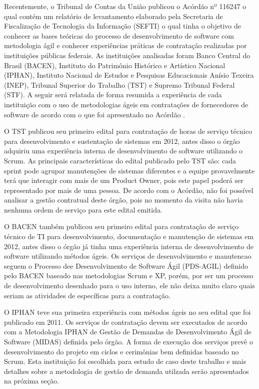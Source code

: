 Recentemente, o Tribunal de Contas da União publicou o Acórdão nº 116247 o qual contém um relatório de levantamento elaborado pela Secretaria de Fiscalização de Tecnologia da Informação (SEFTI) o qual tinha o objetivo de conhecer as bases teóricas do processo de desenvolvimento de software com metodologia ágil e conhecer experiências práticas de contratação realizadas por instituições públicas federais. As instituições analisadas foram Banco Central do Brasil (BACEN), Instituto do Patrimônio Histórico e Artístico Nacional (IPHAN), Instituto Nacional de Estudos e Pesquisas Educacionais Anísio Texeira (INEP), Tribunal Superior do Trabalho (TST) e Supremo Tribunal Federal (STF). A seguir será relatada de forma resumida a experiência de cada instituição com o uso de metodologias ágeis em contratações de fornecedores de software de acordo com o que foi apresentado no Acórdão  \cite{TCU:2013}.

O TST publicou seu primeiro edital para contratação de horas de serviço técnico para desenvolvimento e sustentação de sistemas em 2012, antes disso o órgão adquiriu uma experiência interna de desenvolvimento de software utilizando o Scrum. As principais características do edital publicado pelo TST são: cada sprint pode agrupar manutenções de sistemas diferentes e a equipe provavelmente terá que interagir com mais de um Product Owner, pois este papel poderá ser representado por mais de uma pessoa. De acordo com o Acórdão, não foi possível analisar a gestão contratual deste órgão, pois no momento da visita não havia nenhuma ordem de serviço para este edital emitida.

O BACEN também publicou seu primeiro edital para contratação de serviço técnico de TI para desenvolvimento, documentação e manutenção de sistemas em 2012, antes disso o órgão já tinha uma experiência interna de desenvolvimento de software utilizando métodos ágeis. Os serviços de desenvolvimento e manutencao seguem o Processo dee Desenvolvimento de Software Ágil (PDS-AGIL) definido pelo BACEN baseado nas metodologias Scrum e XP, porém, por ser um processo de desenvolvimento desenhado para o uso interno, ele não deixa muito claro quais seriam as atividades de específicas para a contratação. 

O IPHAN teve sua primeira experiência com métodos ágeis no seu edital que foi publicado em 2011. Os serviços de contratação devem ser executados de acordo com a Metodologia IPHAN de Gestão de Demandas de Desenvolvimento Ágil de Software (MIDAS) definida pelo órgão. A forma de execução dos serviços prevê o desenvolvimento do projeto em ciclos e cerimônias bem definidas baseado no Scrum. Esta instituição foi escolhida para estudo de caso deste trabalho e mais detalhes sobre a metodologia de gestão de demanda utilzada serão apresentados na próxima seção. 


